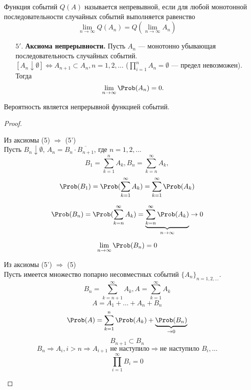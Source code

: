 \begin{definition}
  Функция событий $Q(A)$ называется непревывной, если для любой монотонной последовательности случайных событий выполняется равенство
  \[
    \lim\limits_{n \to \infty} Q(A_n) = Q(\lim\limits_{n \to \infty} A_n)
  \]
\end{definition}
\begin{enumerate}
  \setcounter{enumi}{4}
  \item[$5'.$] \textbf{Аксиома непрерывности.} Пусть $A_n$ --- монотонно убывающая последовательность случайных событий. \\ $[A_n \downarrow \emptyset] \Leftrightarrow A_{n+1} \subset A_n, n = 1, 2, \dots$ ($\prod\limits_{i=1}^n A_n = \emptyset$ --- предел невозможен). Тогда
  \[
    \lim\limits_{n \to \infty} \Prob(A_n) = 0.
  \]
\end{enumerate}

\begin{theorem}
  Вероятность является непрерывной функцией событий.
\end{theorem}
\begin{proof}
\begin{description}[leftmargin = 0cm]
  \item Из аксиомы (5) $\Rightarrow$ (5') \\
  Пусть $B_n \downarrow \emptyset$, $A_n = B_n \cdot \overline{B_{n+1}}$, где $n = 1,2, \dots$ \\
  \[
    B_1 = \sum\limits_{k=1}^n A_k, B_n = \sum\limits_{k=n}^\infty A_k,
  \]
  \[
    \Prob(B_1) = \Prob(\sum\limits_{k=1}^\infty A_k) = \sum\limits_{k=1}^\infty \Prob(A_k)
  \]

  \[ \Prob(B_n) = \Prob(\sum\limits_{k=n}^\infty A_k) = \underbrace{\sum\limits_{k=n}^\infty \Prob(A_k)}_{n \to \infty} \to 0 \]

  \[ \lim\limits_{n \to \infty} \Prob (B_n) = 0\]
  \item Из аксиомы (5') $\Rightarrow$ (5) \\
  Пусть имеется множество попарно несовместных событий ${\{A_n\}}_{n = 1, 2, \dots}$.
  \[ B_n = \sum\limits_{k=n+1}^\infty A_k, A = \sum\limits_{k=1}^\infty A_k \]
  \[ A = A_1 + \ldots + A_n + B_n \]
  \[ \Prob(A) = \sum\limits_{k=1}^n \Prob(A_k) + \underbrace{\Prob(B_n)}_{\to 0} \]
  \[ B_{n+1} \subset B_n \]
  \[ B_n \Rightarrow A_i, i > n \Rightarrow A_{i+1} \text{ не наступило} \Rightarrow \text{не наступило } B_i, \dots \]
  \[ \prod\limits_{i=1}^\infty B_i = 0 \]
\end{description}
\end{proof}
